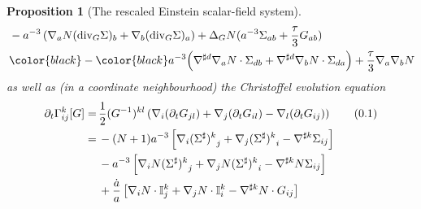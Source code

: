 \documentclass[11pt,leqno,textwidth=10cm]{amsart}
\numberwithin{equation}{section}
\theoremstyle{definition}
\theoremstyle{plain}
\newtheorem{prop}[definition]{Proposition}
\newcommand{\1}{\mathbbm{1}}
\newcommand{\I}{\mathbb{I}}
\newcommand{\M}{\overline{M}}
\newcommand{\del}{\partial}
\newcommand{\Lap}{\Delta}
\renewcommand{\div}{\text{\normalfont{div}}}
\newcommand{\Gamhat}{\hat{\Gamma}}
\newcommand{\numberthis}{\addtocounter{equation}{1}\tag{\theequation}}
\renewcommand{\theequation}{\arabic{section}.\arabic{equation}}
\newcommand{\change}[1]{\color{black}#1\color{black}}
\begin{document}
\begin{prop}[The rescaled Einstein scalar-field system]
\begin{align*}
&\,-a^{-3}\left(\nabla_a N(\div_G\Sigma)_b+\nabla_b(\div_G\Sigma)_a\right)
+\Lap_GN(a^{-3}\Sigma_{ab}+\frac{\tau}3G_{ab})\\
&\,\change{-}a^{-3}\Bigr(\nabla^{\sharp d}\nabla_a N\cdot \Sigma_{db}+\nabla^{\sharp d}\nabla_b N\cdot\Sigma_{da}\Bigr)+\frac\tau3\nabla_a\nabla_bN
\end{align*}
as well as (in a coordinate neighbourhood) the Christoffel evolution equation
\begin{align*}
\del_t\Gamma_{ij}^k[G]=&\,\frac12 (G^{-1})^{kl}\left(\nabla_i(\del_tG_{jl})+\nabla_j(\del_tG_{il})-\nabla_l(\del_tG_{ij})\right) \numberthis\label{eq:REEqChr}\\
=&\,-(N+1)a^{-3}\left[\nabla_i{(\Sigma^\sharp)^k}_j+\nabla_j{(\Sigma^\sharp)^k}_i-\nabla^{\sharp k}\Sigma_{ij}\right]\\
&\,-a^{-3}\left[\nabla_iN{(\Sigma^\sharp)^k}_j+\nabla_jN{(\Sigma^\sharp)^k}_i-\nabla^{\sharp k}N\Sigma_{ij}\right]\\
&\,+\frac{\dot{a}}a\left[\nabla_i N\cdot\I^k_j+\nabla_jN\cdot\I^k_i-\nabla^{\sharp k}N\cdot G_{ij}\right]
\end{align*}
\end{prop}
\end{document}
